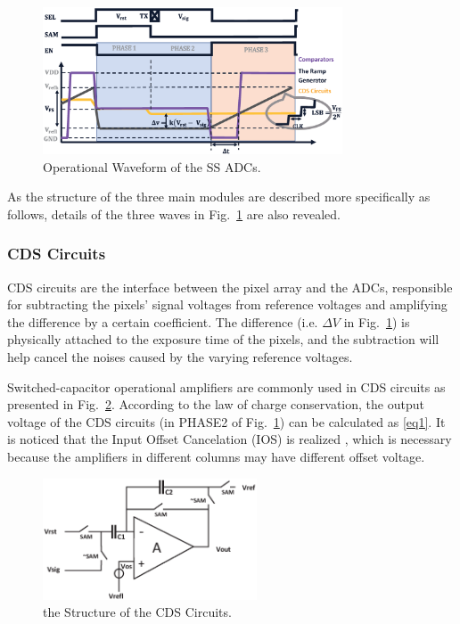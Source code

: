 \documentclass[conference]{IEEEtran}
\begin{document}
\begin{figure}[htbp]
	\centerline{\includegraphics[width=3.5in]{./Figures/SSWAVE.eps}}
	\caption{Operational Waveform of the SS ADCs.}
	\label{SSWAVE}
\end{figure}

As the structure of the three main modules are described more specifically as follows, details of the three waves in Fig.~\ref{SSWAVE} are also revealed.

\subsubsection{CDS Circuits}

CDS circuits are the interface between the pixel array and the ADCs, responsible for subtracting the pixels’ signal voltages from reference voltages and 
amplifying the difference by a certain coefficient. The difference (i.e. $\Delta{V}$ in Fig.~\ref{SSWAVE}) is physically attached to the exposure time of the pixels, 
and the subtraction will help cancel the noises caused by the varying reference voltages. 

Switched-capacitor operational amplifiers are commonly used in CDS circuits as presented in Fig.~\ref{CDS}. According to the law of charge conservation, 
the output voltage of the CDS circuits (in PHASE2 of Fig.~\ref{SSWAVE}) can be calculated as \eqref{eq1}. It is noticed that the Input Offset Cancelation (IOS) is realized \cite{razavi_design_1992}, 
which is necessary because the amplifiers in different columns may have different offset voltage.

\begin{figure}[htbp]
	\centerline{\includegraphics[width=2.5in]{./Figures/CDS.eps}}
	\caption{the Structure of the CDS Circuits.}
	\label{CDS}
\end{figure} 
\end{document}

